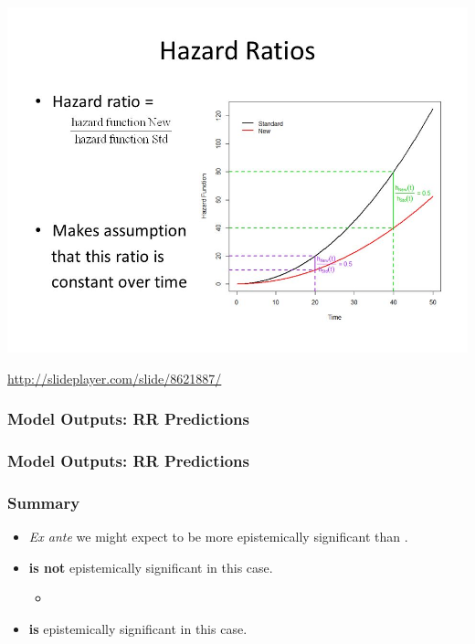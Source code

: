 \documentclass{philslides}
\begin{document}
\frame
{
	\begin{center}
	\includegraphics[height = .9\textheight]{hazard.jpg}
	\end{center}
	\vfill
	\tiny \url{http://slideplayer.com/slide/8621887/}
}
\frame
{
	\frametitle{Model Outputs: RR Predictions}
}
\frame
{
	\frametitle{Model Outputs: RR Predictions}
}
\frame
{
	\frametitle{Summary}
	\begin{itemize}
	\item \emph{Ex ante} we might expect  to be more epistemically significant than .  
	\item {} \textbf{is not} epistemically significant in this case.  
		\begin{itemize}
		\item {}
		\end{itemize}
	\item {} \textbf{is} epistemically significant in this case.  
	\end{itemize}
}
	
	



\section*{}
\frame
{
	\titlepage
}

\end{document}
